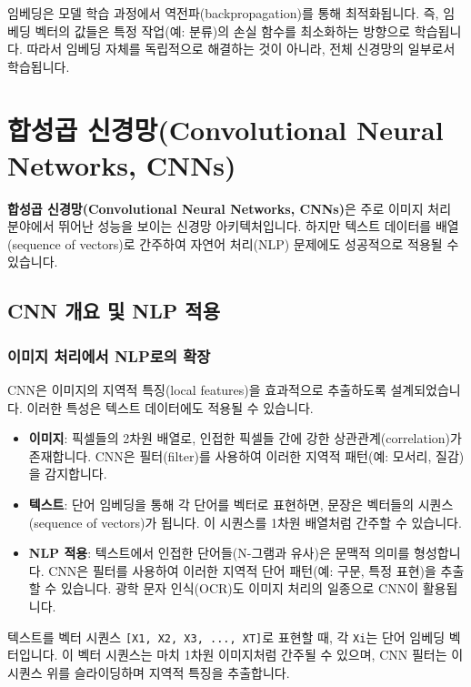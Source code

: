 \documentclass[11pt,a4paper]{article}
\begin{document}
\begin{warningbox}
임베딩은 모델 학습 과정에서 역전파(backpropagation)를 통해 최적화됩니다. 즉, 임베딩 벡터의 값들은 특정 작업(예: 분류)의 손실 함수를 최소화하는 방향으로 학습됩니다. 따라서 임베딩 자체를 독립적으로 해결하는 것이 아니라, 전체 신경망의 일부로서 학습됩니다.
\end{warningbox}

\newpage
\section{합성곱 신경망(Convolutional Neural Networks, CNNs)}

\begin{conceptbox}
\textbf{합성곱 신경망(Convolutional Neural Networks, CNNs)}은 주로 이미지 처리 분야에서 뛰어난 성능을 보이는 신경망 아키텍처입니다. 하지만 텍스트 데이터를 배열(sequence of vectors)로 간주하여 자연어 처리(NLP) 문제에도 성공적으로 적용될 수 있습니다.
\end{conceptbox}

\subsection{CNN 개요 및 NLP 적용}

\subsubsection{이미지 처리에서 NLP로의 확장}
CNN은 이미지의 지역적 특징(local features)을 효과적으로 추출하도록 설계되었습니다. 이러한 특성은 텍스트 데이터에도 적용될 수 있습니다.

\begin{itemize}
    \item \textbf{이미지}: 픽셀들의 2차원 배열로, 인접한 픽셀들 간에 강한 상관관계(correlation)가 존재합니다. CNN은 필터(filter)를 사용하여 이러한 지역적 패턴(예: 모서리, 질감)을 감지합니다.
    \item \textbf{텍스트}: 단어 임베딩을 통해 각 단어를 벡터로 표현하면, 문장은 벡터들의 시퀀스(sequence of vectors)가 됩니다. 이 시퀀스를 1차원 배열처럼 간주할 수 있습니다.
    \item \textbf{NLP 적용}: 텍스트에서 인접한 단어들(N-그램과 유사)은 문맥적 의미를 형성합니다. CNN은 필터를 사용하여 이러한 지역적 단어 패턴(예: 구문, 특정 표현)을 추출할 수 있습니다. 광학 문자 인식(OCR)도 이미지 처리의 일종으로 CNN이 활용됩니다.
\end{itemize}

\begin{examplebox}
텍스트를 벡터 시퀀스 \texttt{[X1, X2, X3, ..., XT]}로 표현할 때, 각 \texttt{Xi}는 단어 임베딩 벡터입니다. 이 벡터 시퀀스는 마치 1차원 이미지처럼 간주될 수 있으며, CNN 필터는 이 시퀀스 위를 슬라이딩하며 지역적 특징을 추출합니다.
\end{examplebox}
\end{document}
